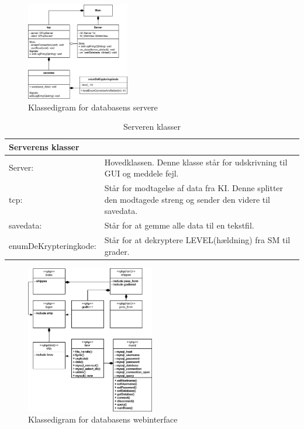 \begin{figure}[htbp]
	\centering
	\includegraphics[width=0.4\textwidth]{billeder/Database/serverKlassediagram}
	\caption{Klassedigram for databasens servere}
	\label{fig:serverKlassediagram}
\end{figure}

\begin{table}[H]
\centering
{}
\begin{tabular}{| p{3cm}  p{12.5cm}|}
\multicolumn{2}{l}{{\Large Serverens klasser}} \\\hline
Server:&Hovedklassen. Denne klasse står for udskrivning til GUI og meddele fejl.\\\hline
tcp:& Står for modtagelse af data fra KI. Denne splitter den modtagede streng og sender den videre til savedata.\\\hline
savedata: & Står for at gemme alle data til en tekstfil.\\\hline
enumDeKrypteringkode:& Står for at dekryptere LEVEL(hældning) fra SM til grader.\\\hline
\end{tabular}
\caption{Serveren klasser}
\label{tabel:server-klasser}
\end{table}

\begin{figure}[H]
	\centering
	\includegraphics[width=0.5\textwidth]{billeder/Database/web_klasse}
	\caption{Klassedigram for databasens webinterface}
	\label{fig:serverKlassediagram}
\end{figure}

